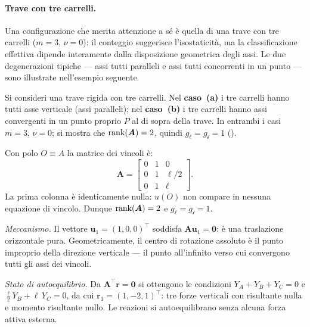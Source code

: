\paragraph{Trave con tre carrelli.}
Una configurazione che merita attenzione a sé è quella di una
trave con tre carrelli ($m = 3$, $\nu = 0$): il conteggio
suggerisce l'isostaticità, ma la classificazione effettiva
dipende interamente dalla disposizione geometrica degli assi.
Le due degenerazioni tipiche --- assi tutti paralleli e assi
tutti concorrenti in un punto --- sono illustrate
nell'esempio seguente.



\begin{esempio}
	\label{ex:tre_carrelli_degeneri}
	Si consideri una trave rigida con tre carrelli. Nel
	\textbf{caso~(a)} i tre carrelli hanno tutti asse verticale
	(assi paralleli); nel \textbf{caso~(b)} i tre carrelli hanno
	assi convergenti in un punto proprio $P$ al di sopra della
	trave. In entrambi i casi $m = 3$, $\nu = 0$; si mostra
	che $\operatorname{rank}(\bm{A}) = 2$, quindi $g_\ell = g_{\mathscr{i}} = 1$
	().
	
	\begin{svolgimento}
		
		Con polo $O \equiv A$ la matrice dei vincoli è:
		\[
		\bm{A} =
		\begin{bmatrix}
			0 & 1 & 0 \\
			0 & 1 & \ell/2 \\
			0 & 1 & \ell
		\end{bmatrix}.
		\]
		La prima colonna è identicamente nulla: $u(O)$ non compare in
		nessuna equazione di vincolo. Dunque $\operatorname{rank}(\bm{A}) = 2$ e
		$g_\ell = g_{\mathscr{i}} = 1$.
		
		\smallskip
		\noindent\textit{Meccanismo.}
		Il vettore $\bm{u}_1 = (1, 0, 0)^\top$ soddisfa
		$\bm{A}\bm{u}_1 = \bm{0}$: è una traslazione orizzontale pura.
		Geometricamente, il centro di rotazione assoluto è il punto
		improprio della direzione verticale --- il punto all'infinito
		verso cui convergono tutti gli assi dei vincoli.
		
		\smallskip
		\noindent\textit{Stato di autoequilibrio.}
		Da $\bm{A}^\top\bm{r} = \bm{0}$ si ottengono le condizioni
		$Y_A + Y_B + Y_C = 0$ e $\tfrac{\ell}{2}Y_B + \ell\,Y_C = 0$,
		da cui $\bm{r}_1 = (1, -2, 1)^\top$: tre forze verticali con
		risultante nulla e momento risultante nullo. Le reazioni si
		autoequilibrano senza alcuna forza attiva esterna.
		

\end{svolgimento}
\end{esempio}
